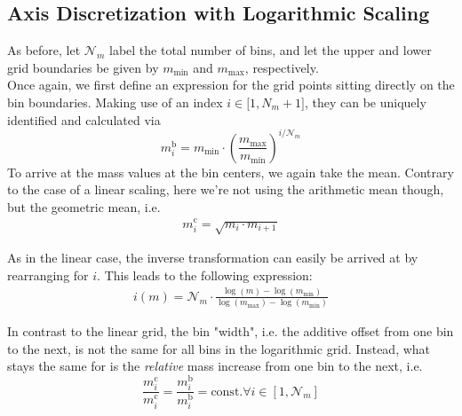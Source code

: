  
    \subsection{Axis Discretization with Logarithmic Scaling}

        As before, let $\mathcal N_m$ label the total number of bins, and let the upper and lower grid 
        boundaries be given by $m_\text{min}$ and $m_\text{max}$, respectively.\\
        
        Once again, we first define an expression for the grid points sitting directly on the bin 
        boundaries. Making use of an index $i\in\mathcal[1,N_m+1]$, they can be uniquely identified and
        calculated via
        \begin{equation}
            m_i^\text{b}
                =m_\text{min}\cdot\left(\frac{m_\text{max}}{m_\text{min}}\right)^{i/\mathcal N_m}
        \end{equation}
        To arrive at the mass values at the bin centers, we again take the mean. Contrary to the case of 
        a linear scaling, here we're not using the arithmetic mean though, but the geometric mean, i.e.
        \begin{align}
            m_i^\text{c}
                =\sqrt{m_i\cdot m_{i+1}}
        \end{align}
    
        As in the linear case, the inverse transformation can easily be arrived at by rearranging for 
        $i$. This leads to the following expression:
        \begin{align}
            i(m)
                =\mathcal N_m\cdot
                    \frac{\log(m)-\log(m_\text{min})}{\log(m_\text{max})-\log(m_\text{min})}
        \end{align}
        
        In contrast to the linear grid, the bin "width", i.e. the additive offset from one bin to the 
        next, is not the same for all bins in the logarithmic grid. Instead, what stays the same for is 
        the \textit{relative} mass increase from one bin to the next, i.e.
        \begin{equation}
            \frac{m_i^\text{c}}{m_i^\text{c}}
                =\frac{m_i^\text{b}}{m_i^\text{b}}
                =\text{const.}
                \forall i\in[1,\mathcal N_m]
        \end{equation}

